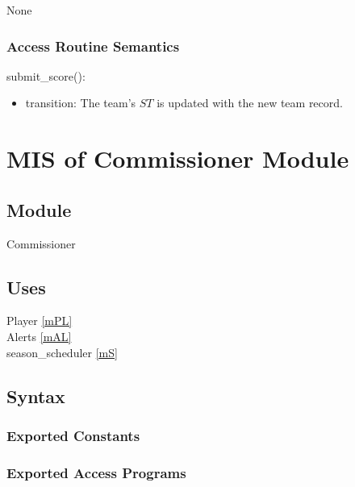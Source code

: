 \documentclass[12pt, titlepage]{article}
\begin{document}

None

\subsubsection{Access Routine Semantics}

\noindent submit\_score():
\begin{itemize}
\item transition: The team's $ST$ is updated with the new team record.
\end{itemize}

\newpage

\section{MIS of Commissioner Module} \label{mCM}

\subsection{Module}

Commissioner

\subsection{Uses}

Player \ref{mPL}\\
Alerts \ref{mAL}\\
season\_scheduler \ref{mS}

\subsection{Syntax}

\subsubsection{Exported Constants}

\subsubsection{Exported Access Programs}
\end{document}
